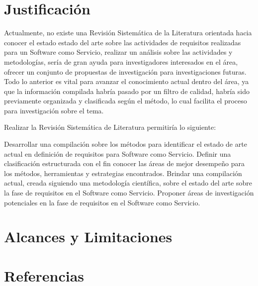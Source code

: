 \documentclass{article}
\begin{document}
\section{Justificación}

Actualmente, no existe una Revisión Sistemática de la Literatura orientada hacia conocer el estado estado del arte sobre las actividades de requisitos realizadas para un Software como Servicio, 
realizar un análisis sobre las actividades y metodologías, sería de gran ayuda para investigadores interesados en el área, ofrecer un conjunto de propuestas de investigación para investigaciones futuras. 
Todo lo anterior es vital para avanzar el conocimiento actual dentro del área, ya que la información compilada habría pasado por un filtro de calidad, habría sido previamente organizada y clasificada 
según el método, lo cual facilita el proceso para investigación sobre el tema. 

Realizar la Revisión Sistemática de Literatura permitiría lo siguiente: 

Desarrollar una compilación sobre los métodos para identificar el estado de arte actual en definición de requisitos para Software como Servicio.
Definir una clasificación estructurada con el fin conocer las áreas de mejor desempeño para los métodos, herramientas y estrategias encontrados.
Brindar una compilación actual, creada siguiendo una metodología científica, sobre el estado del arte sobre la fase de requisitos en el Software como Servicio.
Proponer áreas de investigación potenciales en la fase de requisitos en el Software como Servicio.
\newpage


\section{Alcances y Limitaciones}

\section{Referencias}
\printbibliography
\end{document}
